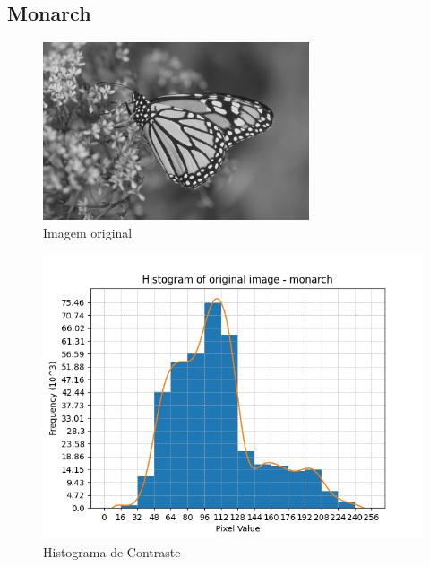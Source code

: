 \documentclass[12pt, letterpaper]{article}
\begin{document}
    \subsection{Monarch}
        \begin{figure}[H]
            \label{hist:monarch}
            \centering
            \includegraphics[width=0.7\textwidth]{monarch.png}
            \\{Imagem original}

            \includegraphics[width=1\textwidth]{monarch_histogram.png}
            \\{Histograma de Contraste}
        \end{figure}
\end{document}
